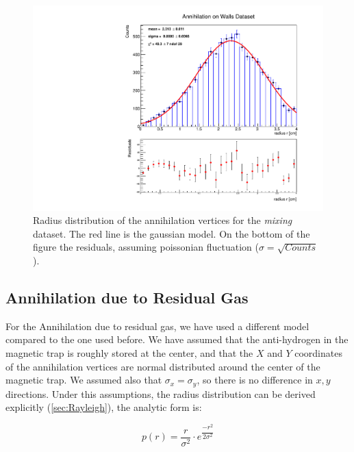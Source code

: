 \documentclass[11pt,a4paper,oneside]{article}
\begin{document}
\begin{figure}[hbtp]
\includegraphics[width = 1\textwidth]{../ALPHA-2/PlotMLEfit/SingleModel/AnnihilationOnWalls.pdf}
\caption{Radius distribution of the annihilation vertices for the \textit{mixing} dataset. The red line is the gaussian model. On the bottom of the figure the residuals, assuming poissonian fluctuation ($\sigma = \sqrt{Counts}$).}
\label{fig:MixingFit}
\end{figure}

\subsection*{Annihilation due to Residual Gas}

For the Annihilation due to residual gas, we have used a different model compared to the one used before. We have assumed that the anti-hydrogen in the magnetic trap is roughly stored at the center, and that the $X$ and $Y$ coordinates of the annihilation vertices are normal distributed around the center of the magnetic trap. We assumed also that $\sigma_{x} = \sigma_{y}$, so there is no difference in $x,y$ directions. Under this assumptions, the radius distribution can be derived explicitly (\ref{sec:Rayleigh}), the analytic form is:

\begin{equation}
p(r) = \frac{r}{\sigma^{2}} \cdot  e^{ \dfrac{- r^{2}}{ 2 \sigma^{2}}}
\end{equation}
\end{document}
